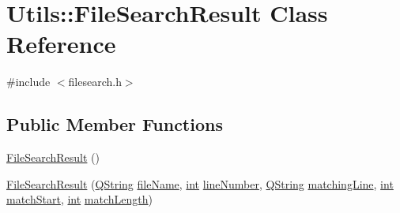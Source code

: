 \hypertarget{class_utils_1_1_file_search_result}{\section{Utils\-:\-:File\-Search\-Result Class Reference}
\label{class_utils_1_1_file_search_result}
}


{\ttfamily \#include $<$filesearch.\-h$>$}

\subsection*{Public Member Functions}
\begin{DoxyCompactItemize}
\item 
\hyperlink{class_utils_1_1_file_search_result_afc086f77d2195a153caf39e65abc54a8}{File\-Search\-Result} ()
\item 
\hyperlink{class_utils_1_1_file_search_result_ad1365f94c51572bc38e73ddfe5705b3f}{File\-Search\-Result} (\hyperlink{group___u_a_v_objects_plugin_gab9d252f49c333c94a72f97ce3105a32d}{Q\-String} \hyperlink{class_utils_1_1_file_search_result_a6768edb856c8a6055d2e3e04dc94a969}{file\-Name}, \hyperlink{ioapi_8h_a787fa3cf048117ba7123753c1e74fcd6}{int} \hyperlink{class_utils_1_1_file_search_result_a5bd90f47d915c5af4af62bed46abe7c2}{line\-Number}, \hyperlink{group___u_a_v_objects_plugin_gab9d252f49c333c94a72f97ce3105a32d}{Q\-String} \hyperlink{class_utils_1_1_file_search_result_a9fb2f9e0118742e307425f781375e572}{matching\-Line}, \hyperlink{ioapi_8h_a787fa3cf048117ba7123753c1e74fcd6}{int} \hyperlink{class_utils_1_1_file_search_result_a98b3933b899ba1a74c80c1910ff7701f}{match\-Start}, \hyperlink{ioapi_8h_a787fa3cf048117ba7123753c1e74fcd6}{int} \hyperlink{class_utils_1_1_file_search_result_a57bcfdc2bdae981ab37fb9e27bb244c5}{match\-Length})
\end{DoxyCompactItemize}
